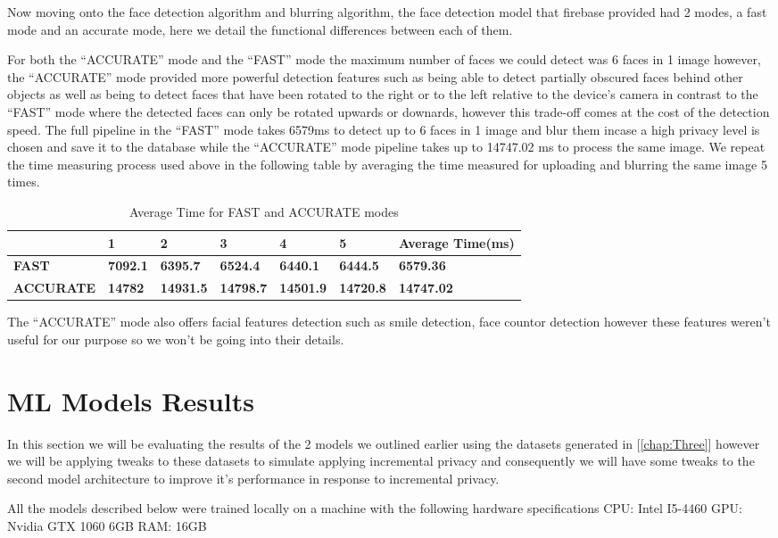 Now moving onto the face detection algorithm and blurring algorithm, the face detection model that firebase provided had 2 modes, a fast mode and an accurate mode, here we detail the functional differences between each of them.\par
For both the “ACCURATE” mode and the “FAST” mode the maximum number of faces we could detect was 6 faces in 1 image however, the “ACCURATE” mode provided more powerful detection features such as being able to detect partially obscured faces behind other objects
as well as being to detect faces that have been rotated to the right or to the left relative to the device's camera in contrast to the “FAST” mode where the detected faces can only be rotated upwards or downards, however this trade-off comes at the cost of the detection speed. The full pipeline in the “FAST” mode takes \num{6579}ms to detect up to 6 faces in 1 image and blur them incase a high privacy level is chosen and save it to the database
while the “ACCURATE” mode pipeline takes up to \num{14747.02} ms to process the same image. We repeat the time measuring process used above in the following table by averaging the time measured for uploading and blurring the same image 5 times.
\newline
\begin{table}[!h]
    \addtolength{\tabcolsep}{-2.75pt}
    \begin{tabular}{|l|l|l|l|l|l|l|}
    \hline
    \textbf{} & \textbf{1} & \textbf{2} & \textbf{3} & \textbf{4} & \textbf{5} & \textbf{Average Time(ms)} \\ \hline
    \textbf{FAST} & \textbf{7092.1} & \textbf{6395.7} & \textbf{6524.4} & \textbf{6440.1} & \textbf{6444.5} & \textbf{6579.36} \\ \hline
    \textbf{ACCURATE} & \textbf{14782} & \textbf{14931.5} & \textbf{14798.7} & \textbf{14501.9} & \textbf{14720.8} & \textbf{14747.02} \\ \hline
    \end{tabular}
    \caption{Average Time for FAST and ACCURATE modes}
    \label{tab:FASTACC}
\end{table}

The “ACCURATE” mode also offers facial features detection such as smile detection, face countor detection however these features weren't useful for our purpose so we won't be going into their details.
\section{ML Models Results}
In this section we will be evaluating the results of the 2 models we outlined earlier using the datasets generated in [\ref{chap:Three}] however we will be applying tweaks to these datasets to simulate applying incremental privacy and consequently we will have some tweaks to the second model architecture to improve it's performance in response to incremental privacy.\par
All the models described below were trained locally on a machine with the following hardware specifications CPU: Intel I5-4460 GPU: Nvidia GTX 1060 6GB RAM: 16GB
